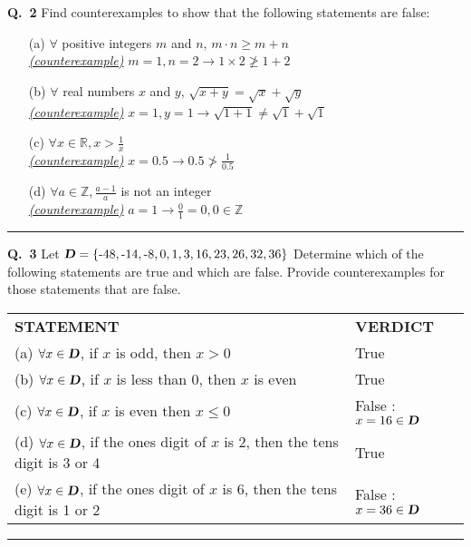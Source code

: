 \documentclass[a4paper,12pt]{article}
\newcommand{\sz}{\text{-}}
\begin{document}
\noindent \textbf{Q.~2} Find counterexamples to show that the following statements are false:
\begin{itemize}
    \item[(a)] $\forall$ positive integers $m$ and $n$, $m \cdot n \geq m + n $\\
        \textsl{\ul{(counterexample)}} $m=1, n=2 \rightarrow 1 \times 2 \ngeq 1 + 2$
    \item[(b)] $\forall$ real numbers $x$ and $y$, $\sqrt{x+y} = \sqrt{x} + \sqrt{y}$\\
        \textsl{\ul{(counterexample)}} $x=1, y=1 \rightarrow \sqrt{1+1} \neq \sqrt{1} + \sqrt{1}$
    \item[(c)] $\forall x \in \mathbb{R}, x > \frac{1}{x}$\\
        \textsl{\ul{(counterexample)}} $x = 0.5 \rightarrow 0.5 \ngtr \frac{1}{0.5}$
    \item[(d)] $\displaystyle \forall a \in \mathbb{Z}, \frac{a-1}{a}$ is not an integer\\
        \textsl{\ul{(counterexample)}} $a = 1 \rightarrow \frac{0}{1} = 0, 0 \in \mathbb{Z}$
\end{itemize}

\begin{center}
    \rule{6cm}{0.4pt}
\end{center}
\newpage

\noindent \textbf{Q.~3} Let $\text{\textsl{\textbf{D}}} = \{\sz48, \sz14, \sz8, 0, 1, 3, 16, 23, 26, 32, 36\}$ Determine which of the following statements are true and which are false. Provide counterexamples for those statements that are false.

\noindent
\bgroup
\def\arraystretch{1.5}
{
    \begin{tabular}{m{23em} | l }
        \textbf{STATEMENT}                                                                                           & \textbf{VERDICT} \\
        (a) $\forall x \in \text{\textsl{\textbf{D}}}$, if $x$ is odd, then $x>0$                                    & True             \\
        (b) $\forall x \in \text{\textsl{\textbf{D}}}$, if $x$ is less than 0, then $x$ is even                      & True             \\
        (c) $\forall x \in \text{\textsl{\textbf{D}}}$, if $x$ is even then $x \leq 0$                               & False : $x = 16 \in \text{\textsl{\textbf{D}}}$ \\
        (d) $\forall x \in \text{\textsl{\textbf{D}}}$, if the ones digit of $x$ is 2, then the tens digit is 3 or 4 & True \\
        (e) $\forall x \in \text{\textsl{\textbf{D}}}$, if the ones digit of $x$ is 6, then the tens digit is 1 or 2 & False : $x = 36 \in \text{\textsl{\textbf{D}}}$ \\
    \end{tabular}}
\egroup
\begin{center}
    \rule{6cm}{0.4pt}
\end{center}
\end{document}
